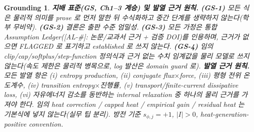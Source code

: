 \documentclass[11pt,a4paper]{article}
\newtheorem*{groundingbox}{Grounding}
\newcommand{\AL}[1]{\textsf{[AL-#1]}}
\begin{document}
\begin{groundingbox}
\textbf{지배 표준(GS, Ch1--3 계승) 및 발열 근거 원칙.} \textbf{(GS-1)} 모든 식은 물리적 의미를 prose 로 먼저
말한 뒤 수식화하고 중간 단계를 생략하지 않는다(학부 무비약). \textbf{(GS-2)} 결론은 출판 수준 엄밀성.
\textbf{(GS-3)} 모든 가정은 통합 Assumption Ledger(\AL{\#}: 논문/교과서 근거 + 검증 DOI)를 인용하며, 근거가
없으면 FLAGGED 로 표기하고 established 로 쓰지 않는다. \textbf{(GS-4)} 임의 clip/cap/softplus/step-function
정의식과 근거 없는 수치 임계값을 물리 모델로 쓰지 않는다(속도 제한은 물리적 병목으로, log 발산은 domain guard
로). \textbf{발열 근거 원칙.} 모든 발열 항은 (i) entropy production, (ii) conjugate flux$\times$force, (iii)
평형 전위 온도계수, (iv) transition entropy$\times$진행률, (v) transport/finite-current dissipative loss, (vi)
자유에너지 감소를 동반하는 internal relaxation 중 하나의 \emph{물리} 근거를 가져야 한다. 임의 heat correction /
capped heat / empirical gain / residual heat 는 기본식에 넣지 않는다(실무 팁 분리). 방전 기준 $s_{\phi,j}=+1$,
$|I|>0$, heat-generation-positive convention.
\end{groundingbox}

\tableofcontents
\newpage

\end{document}
